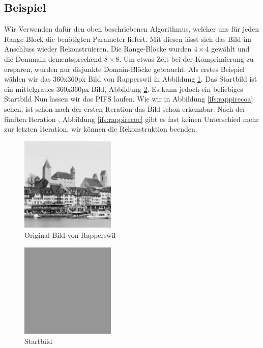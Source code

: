 \subsection{Beispiel}
Wir Verwenden dafür den oben beschriebenen Algorithmus, welcher uns für jeden Range-Block die benötigten Parameter liefert.
Mit diesen lässt sich das Bild im Anschluss wieder Rekonstruieren.
Die Range-Blöcke wurden $4\times4$ gewählt und die Dommain dementsprechend $8\times8$.
Um etwas Zeit bei der Komprimierung zu ersparen, wurden nur disjunkte Domain-Blöcke gebraucht.
Als erstes Beispiel wählen wir das 360x360px Bild von Rapperswil in Abbildung \ref{ifs:original}.
Das Startbild ist ein mittelgraues 360x360px Bild, Abbildung \ref{ifs:bild0}.
Es kann jedoch ein beliebiges Startbild
Nun lassen wir das PIFS laufen.
Wie wir in Abbildung \ref{ifs:rappirecoa} sehen, ist schon nach der ersten Iteration das Bild schon erkennbar.
Nach der fünften Iteration , Abbildung \ref{ifs:rappirecoc} gibt es fast keinen Unterschied mehr zur letzten Iteration, wir können die Rekonstruktion beenden.
\begin{figure}	
	\centering
	\includegraphics[width=0.4\textwidth]{papers/ifs/images/original}
	\caption{Original Bild von Rapperswil}
	\label{ifs:original}
\end{figure}
\begin{figure}
	\centering
	\includegraphics[width=0.4\textwidth]{papers/ifs/images/rapperswil}
	\caption{Startbild}
	\label{ifs:bild0}
\end{figure}

